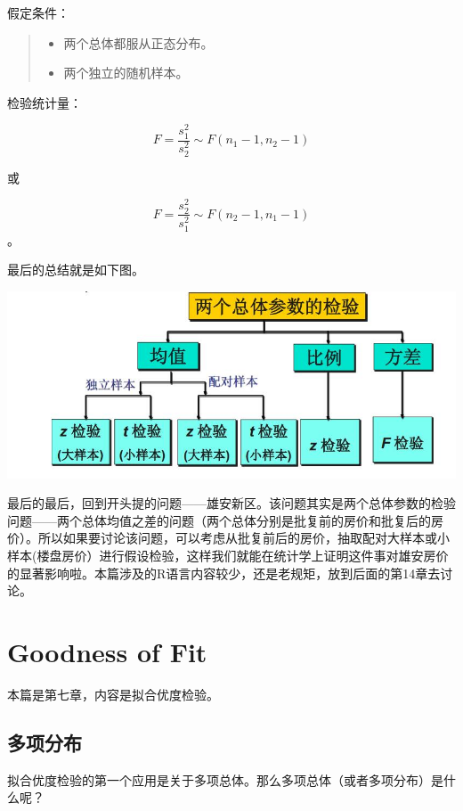 \documentclass[]{ctexbook}
\providecommand{\tightlist}{%
  \setlength{\itemsep}{0pt}\setlength{\parskip}{0pt}}
\begin{document}
假定条件：

\begin{quote}
\begin{itemize}
\tightlist
\item
  两个总体都服从正态分布。
\item
  两个独立的随机样本。
\end{itemize}
\end{quote}

检验统计量：

\[F=\frac{s_1^2}{s_2^2}\sim F(n_1-1,n_2-1)\]

或

\[F=\frac{s_2^2}{s_1^2}\sim F(n_2-1,n_1-1)\]。

最后的总结就是如下图。

\includegraphics[width=1\linewidth,height=0.35\textheight]{fig/fig19}

最后的最后，回到开头提的问题------雄安新区。该问题其实是两个总体参数的检验问题------两个总体均值之差的问题（两个总体分别是批复前的房价和批复后的房价）。所以如果要讨论该问题，可以考虑从批复前后的房价，抽取配对大样本或小样本(楼盘房价）进行假设检验，这样我们就能在统计学上证明这件事对雄安房价的显著影响啦。本篇涉及的R语言内容较少，还是老规矩，放到后面的第14章去讨论。

\hypertarget{goodness}{%
\chapter{Goodness of Fit}\label{goodness}}

本篇是第七章，内容是拟合优度检验。

\hypertarget{ux591aux9879ux5206ux5e03}{%
\section{多项分布}\label{ux591aux9879ux5206ux5e03}}

拟合优度检验的第一个应用是关于多项总体。那么多项总体（或者多项分布）是什么呢？
\end{document}
